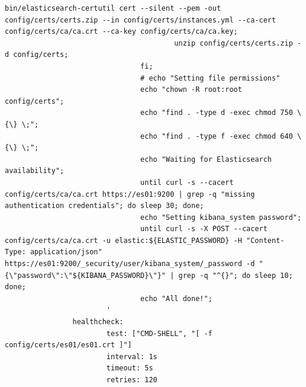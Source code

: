 \documentclass[a4paper,12pt]{article}
\begin{document}
\begin{lstlisting}[title=DockerCompose]
                                        bin/elasticsearch-certutil cert --silent --pem -out config/certs/certs.zip --in config/certs/instances.yml --ca-cert config/certs/ca/ca.crt --ca-key config/certs/ca/ca.key;
                                        unzip config/certs/certs.zip -d config/certs;
                                fi;
                                # echo "Setting file permissions"
                                echo "chown -R root:root config/certs";
                                echo "find . -type d -exec chmod 750 \{\} \;";
                                echo "find . -type f -exec chmod 640 \{\} \;";
                                echo "Waiting for Elasticsearch availability";
                                until curl -s --cacert config/certs/ca/ca.crt https://es01:9200 | grep -q "missing authentication credentials"; do sleep 30; done;
                                echo "Setting kibana_system password";
                                until curl -s -X POST --cacert config/certs/ca/ca.crt -u elastic:${ELASTIC_PASSWORD} -H "Content-Type: application/json" https://es01:9200/_security/user/kibana_system/_password -d "{\"password\":\"${KIBANA_PASSWORD}\"}" | grep -q "^{}"; do sleep 10; done;
                                echo "All done!";
                        '
                healthcheck:
                        test: ["CMD-SHELL", "[ -f config/certs/es01/es01.crt ]"]
                        interval: 1s
                        timeout: 5s
                        retries: 120



\end{lstlisting}
\end{document}
